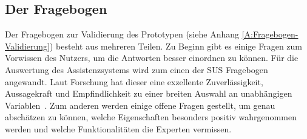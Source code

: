 \subsection{Der Fragebogen}
Der Fragebogen zur Validierung des Prototypen (siehe Anhang \ref{A:Fragebogen-Validierung}) besteht aus mehreren Teilen. Zu Beginn gibt es einige Fragen zum Vorwissen des Nutzers, um die Antworten besser einordnen zu können. Für die Auswertung des Assistenzsystems wird zum einen der SUS Fragebogen angewandt. Laut Forschung hat dieser eine \glqq exzellente Zuverlässigkeit, Aussagekraft und Empfindlichkeit zu einer breiten Auswahl an unabhängigen Variablen\grqq \ \citep[1150]{Lewis2018}. Zum anderen werden einige offene Fragen gestellt, um genau abschätzen zu können, welche Eigenschaften besonders positiv wahrgenommen werden und welche Funktionalitäten die Experten vermissen. 

